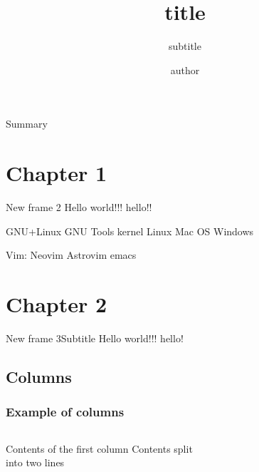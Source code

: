 \documentclass[dracula,Frankfurt,12pt]{darkbeamer}
\author{author}
\title{title}
\subtitle{subtitle}
\institute{My University}
\begin{document}
\begin{frame}{}
	\titlepage
\end{frame}

\begin{frame}{Summary}
	\tableofcontents
\end{frame}

\section{Chapter 1}
\begin{frame}{New frame 2}
	Hello world!!! \alert{hello!!}
	\begin{outline}
		\1 GNU+Linux
			\2 GNU Tools
			\2 kernel Linux
		\1 Mac OS
		\1 Windows
	\end{outline}
	\begin{outline}[enumerate]
		\1 Vim:
			\2 Neovim
			\2 Astrovim
		\1 emacs
	\end{outline}
\end{frame}

\section{Chapter 2}
\begin{frame}{New frame 3}{Subtitle}
	Hello world!!! \alert{hello!}
\end{frame}

\subsection{Columns}
\begin{frame}
	\frametitle{Example of columns}
	\begin{columns}[c]
		Contents of the first column
		Contents split \\ into two lines
	\end{columns}
\end{frame}
\end{document}
